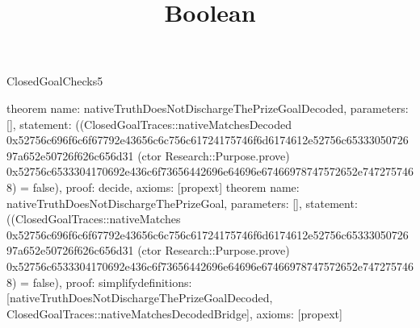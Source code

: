 \begin{lexlean}{ClosedGoalChecks5}
\title{Boolean}
\begin{semanticmodule}
theorem{
 name: nativeTruthDoesNotDischargeThePrizeGoalDecoded,
 parameters: [],
 statement: ((ClosedGoalTraces::nativeMatchesDecoded 0x52756c696f6c6f67792e43656c6c756c61724175746f6d6174612e52756c6533305072697a652e50726f626c656d31 (ctor Research::Purpose.prove) 0x52756c6533304170692e436c6f73656442696e64696e67466978747572652e7472757468) = false),
 proof: decide{},
 axioms: [propext]
}
theorem{
 name: nativeTruthDoesNotDischargeThePrizeGoal,
 parameters: [],
 statement: ((ClosedGoalTraces::nativeMatches 0x52756c696f6c6f67792e43656c6c756c61724175746f6d6174612e52756c6533305072697a652e50726f626c656d31 (ctor Research::Purpose.prove) 0x52756c6533304170692e436c6f73656442696e64696e67466978747572652e7472757468) = false),
 proof: simplify{definitions: [nativeTruthDoesNotDischargeThePrizeGoalDecoded, ClosedGoalTraces::nativeMatchesDecodedBridge]},
 axioms: [propext]
}
\end{semanticmodule}
\end{lexlean}
